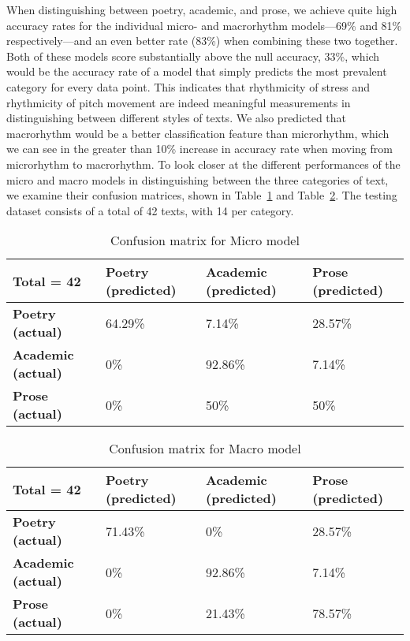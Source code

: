 \documentclass[pageno]{jpaper}
\begin{document}
When distinguishing between poetry, academic, and prose, we achieve quite high accuracy rates for the individual micro- and macrorhythm models---69\% and 81\% respectively---and an even better rate (83\%) when combining these two together. Both of these models score substantially above the null accuracy, 33\%, which would be the accuracy rate of a model that simply predicts the most prevalent category for every data point. This indicates that rhythmicity of stress and rhythmicity of pitch movement are indeed meaningful measurements in distinguishing between different styles of texts. We also predicted that macrorhythm would be a better classification feature than microrhythm, which we can see in the greater than 10\% increase in accuracy rate when moving from microrhythm to macrorhythm. To look closer at the different performances of the micro and macro models in distinguishing between the three categories of text, we examine their confusion matrices, shown in Table~\ref{table:micromatrix} and Table~\ref{table:macromatrix}. The testing dataset consists of a total of 42 texts, with 14 per category.

\begin{table}[hbt]
  \centering
  \begin{tabular}{l l l l}
    \hline \hline
    Total = 42 &\textbf{Poetry (predicted)}&\textbf{Academic (predicted)}&\textbf{Prose (predicted)} \\ [0.5ex] 
    \hline\hline
    \textbf{Poetry (actual)}  & 64.29\%	& 7.14\%	&28.57\% \\
     \textbf{Academic (actual)} &0\%	&92.86\%&	7.14\%\\
     \textbf{Prose (actual)}   &0\%	&50\%&	50\%\\
    \hline
  \end{tabular}
  \caption{Confusion matrix for Micro model}
  \label{table:micromatrix}
\end{table}

\begin{table}[hbt]
  \centering
  \begin{tabular}{l l l l}
    \hline \hline
    Total = 42 &\textbf{Poetry (predicted)}&\textbf{Academic (predicted)}&\textbf{Prose (predicted)} \\ [0.5ex] 
    \hline\hline
    \textbf{Poetry (actual)}  &71.43\%	&0\%	&28.57\% \\
     \textbf{Academic (actual)}& 0\%	&92.86\%&	7.14\%\\
     \textbf{Prose (actual)}  & 0\%	&21.43\%	&78.57\%\\
    \hline
  \end{tabular}
  \caption{Confusion matrix for Macro model}
  \label{table:macromatrix}
\end{table}
\end{document}
